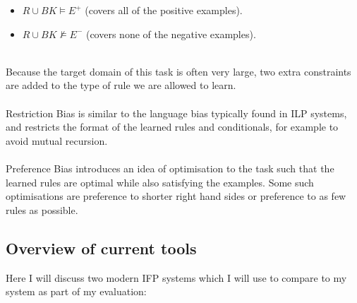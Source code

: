 \begin{itemize}
\item $R \cup BK \models E^+$ (covers all of the positive examples).
\item $R \cup BK \not \models E^-$ (covers none of the negative examples).
\end{itemize}
\mbox{} \\
Because the target domain of this task is often very large, two extra constraints are added to the type of rule we are allowed to learn.\\ \\
Restriction Bias is similar to the language bias typically found in ILP systems, and restricts the format of the learned rules and conditionals, for example to avoid mutual recursion. \\ \\
Preference Bias introduces an idea of optimisation to the task such that the learned rules are optimal while also satisfying the examples. Some such optimisations are preference to shorter right hand sides or preference to as few rules as possible.

\subsection{Overview of current tools}

Here I will discuss two modern IFP systems which I will use to compare to my system as part of my evaluation:


